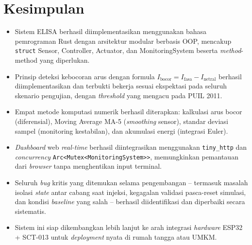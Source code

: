 \documentclass[12pt,a4paper]{article}
\begin{document}
\section{Kesimpulan}

\begin{itemize}
    \item Sistem ELISA berhasil diimplementasikan menggunakan bahasa pemrograman Rust dengan arsitektur modular berbasis OOP, mencakup \texttt{struct} Sensor, Controller, Actuator, dan MonitoringSystem beserta \emph{method}-method yang diperlukan.

    \item Prinsip deteksi kebocoran arus dengan formula $I_{\text{bocor}} = I_{\text{fasa}} - I_{\text{netral}}$ berhasil diimplementasikan dan terbukti bekerja sesuai ekspektasi pada seluruh skenario pengujian, dengan \emph{threshold} yang mengacu pada PUIL 2011.

    \item Empat metode komputasi numerik berhasil diterapkan: kalkulasi arus bocor (diferensial), Moving Average MA-5 (\emph{smoothing} sensor), standar deviasi sampel (monitoring kestabilan), dan akumulasi energi (integrasi Euler).

    \item \emph{Dashboard} web \emph{real-time} berhasil diintegrasikan menggunakan \texttt{tiny\_http} dan \emph{concurrency} \texttt{Arc<Mutex<MonitoringSystem>{}>}, memungkinkan pemantauan dari \emph{browser} tanpa menghentikan input terminal.

    \item Seluruh \emph{bug} kritis yang ditemukan selama pengembangan -- termasuk masalah isolasi \emph{state} antar cabang saat injeksi, kegagalan validasi pasca-reset simulasi, dan kondisi \emph{baseline} yang salah -- berhasil diidentifikasi dan diperbaiki secara sistematis.

    \item Sistem ini siap dikembangkan lebih lanjut ke arah integrasi \emph{hardware} ESP32 + SCT-013 untuk \emph{deployment} nyata di rumah tangga atau UMKM.
\end{itemize}
\end{document}
